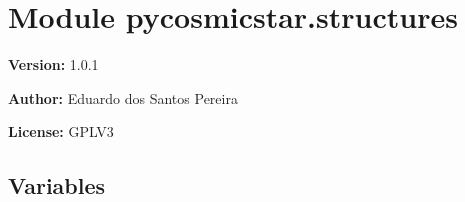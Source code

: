 %
%
%


\section{Module pycosmicstar.structures}

    \label{pycosmicstar:structures}
\textbf{Version:} 1.0.1



\textbf{Author:} Eduardo dos Santos Pereira



\textbf{License:} GPLV3





  \subsection{Variables}

